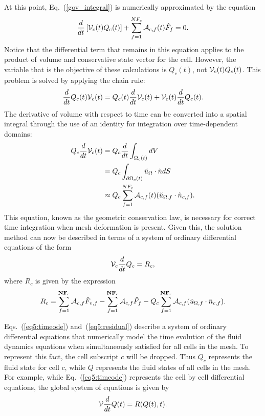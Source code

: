 At this point, Eq.~(\ref{gov_integral}) is numerically
approximated by the equation
\begin{equation}
\frac{d}{dt} \left[\mathcal{V}_c(t) Q_c(t)\right] + 
\sum_{f=1}^{NF_c} \mathcal{A}_{c,f}(t) \hat{F}_f = 0.
\end{equation}
Notice that the differential term that remains in this equation
applies to the product of volume and conservative state vector for the
cell.  However, the variable that is the objective of these
calculations is $Q_c(t)$, not $\mathcal{V}_c(t) Q_c(t)$.  This problem is
solved by applying the chain rule:
\begin{equation}
\frac{d}{dt} Q_c(t) \mathcal{V}_c(t) = Q_c(t) \frac{d}{dt} \mathcal{V}_c(t) + \mathcal{V}_c(t)
\frac{d}{dt} Q_c(t).
\end{equation}
The derivative of volume with respect to time can be converted into a
spatial integral through the use of an identity for integration over
time-dependent domains\cite{Hansen.65}:
\begin{equation}
\begin{split}
Q_c \frac{d}{dt} \mathcal{V}_c(t)& = Q_c \frac{d}{dt} \int_{\Omega_c(t)} dV\\
&= Q_c \int_{\partial \Omega_c(t)} \Tilde{u}_\Omega \cdot \Tilde{n}
dS \\
&\approx Q_c \sum_{f=1}^{NF_c} \mathcal{A}_{c,f}(t) ({\Tilde{u}_{\Omega,f}}
\cdot \Tilde{n}_{c,f}).
\end{split}
\end{equation}
This equation, known as the geometric conservation law\cite{Thomas.78}, is
necessary for correct time integration when mesh deformation is
present.  Given this, the solution method can now be described in
terms of a system of ordinary differential equations of the form
\begin{equation}
\mathcal{V}_c \frac{d}{dt} Q_c = R_c,
\label{eq5:timeode}
\end{equation}
where $R_c$ is given by the expression
\begin{equation}
R_c = \sum_{f=1}^{\mathbf{NF}_c} \mathcal{A}_{c,f} \hat{F}_{v,f} - \sum_{f=1}^{\mathbf{NF}_c} \mathcal{A}_{c,f}
  \hat{F}_f  -  Q_c \sum_{f=1}^{\mathbf{NF}_c} \mathcal{A}_{c,f} ({\Tilde{u}_{\Omega,f}}
\cdot \Tilde{n}_{c,f}).
\label{eq5:residual}
\end{equation}

Eqs.~(\ref{eq5:timeode}) and~(\ref{eq5:residual}) describe a
system of ordinary differential equations that numerically model the
time evolution of the fluid dynamics equations when simultaneously
satisfied for all cells in the mesh.  To represent this fact, the cell
subscript $c$ will be dropped.  Thus $Q_c$ represents the fluid state
for cell $c$, while $Q$ represents the fluid states of all cells in
the mesh.  For example, while Eq.~(\ref{eq5:timeode}) represents
the cell by cell differential equations, the global system of
equations is given by
\begin{equation}
\mathcal{V} \frac{d}{dt} Q(t) = R(Q(t),t).
\label{eq5:timeode2}
\end{equation}



